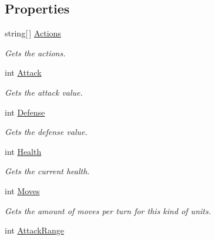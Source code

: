 \subsection*{Properties}
\begin{DoxyCompactItemize}
\item 
string\mbox{[}$\,$\mbox{]} \hyperlink{classCore_1_1Models_1_1Definitions_1_1UnitDefinition_a5fe8e6ee0edb611becffc14e79326797}{Actions}
\begin{DoxyCompactList}\small\item\em Gets the actions. \end{DoxyCompactList}\item 
int \hyperlink{classCore_1_1Models_1_1Definitions_1_1UnitDefinition_aa796297ed1001668bc576763a1491c31}{Attack}
\begin{DoxyCompactList}\small\item\em Gets the attack value. \end{DoxyCompactList}\item 
int \hyperlink{classCore_1_1Models_1_1Definitions_1_1UnitDefinition_a19782c411903ddedb9a3d35fc2afee55}{Defense}
\begin{DoxyCompactList}\small\item\em Gets the defense value. \end{DoxyCompactList}\item 
int \hyperlink{classCore_1_1Models_1_1Definitions_1_1UnitDefinition_ae0a91bec79fd1a79137e5c27668bd089}{Health}
\begin{DoxyCompactList}\small\item\em Gets the current health. \end{DoxyCompactList}\item 
int \hyperlink{classCore_1_1Models_1_1Definitions_1_1UnitDefinition_a0fe401df39765664e20eb9b1d3df4c06}{Moves}
\begin{DoxyCompactList}\small\item\em Gets the amount of moves per turn for this kind of units. \end{DoxyCompactList}\item 
int \hyperlink{classCore_1_1Models_1_1Definitions_1_1UnitDefinition_a3cabb28335201dd47dc52d2d37144ac7}{Attack\+Range}

\end{DoxyCompactItemize}
